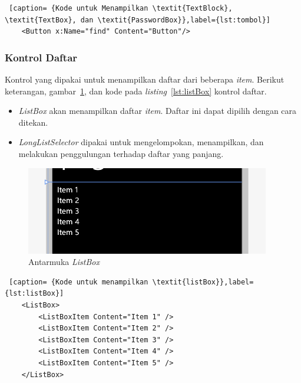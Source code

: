 \begin{lstlisting} [caption= {Kode untuk Menampilkan \textit{TextBlock}, \textit{TextBox}, dan \textit{PasswordBox}},label={lst:tombol}]
	<Button x:Name="find" Content="Button"/>
\end{lstlisting}

\subsubsection{Kontrol Daftar}
\label{subsubsec:Kontrol Daftar}
\hspace{0.5cm} Kontrol yang dipakai untuk menampilkan daftar dari beberapa \textit{item}. Berikut keterangan, gambar~\ref{fig:antarmukaListBox}, dan kode pada \textit{listing}~\ref{lst:listBox} kontrol daftar. 

\begin{itemize}
	\item \textit{ListBox} akan menampilkan daftar \textit{item}. Daftar ini dapat dipilih dengan cara ditekan.
	\item \textit{LongListSelector} dipakai untuk mengelompokan, menampilkan, dan melakukan penggulungan terhadap daftar yang panjang.
\end{itemize}

\newpage

\begin{figure}[h]
	\centering
		\includegraphics[scale=0.4]{Gambar/kontrol/listBox.PNG}
	\caption{Antarmuka \textit{ListBox}}
	\label{fig:antarmukaListBox}
\end{figure}

\begin{lstlisting} [caption= {Kode untuk menampilkan \textit{listBox}},label={lst:listBox}]
	<ListBox>
		<ListBoxItem Content="Item 1" />
		<ListBoxItem Content="Item 2" />
		<ListBoxItem Content="Item 3" />
		<ListBoxItem Content="Item 4" />
		<ListBoxItem Content="Item 5" />
	</ListBox>
\end{lstlisting}

